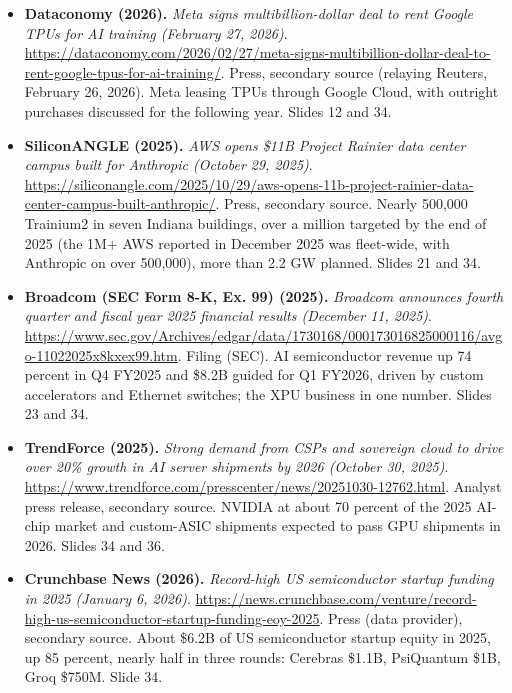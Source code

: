 \begin{itemize}[leftmargin=1.2em,itemsep=3pt]
\item \textbf{Dataconomy (2026).} \textit{Meta signs multibillion-dollar deal to rent Google TPUs for AI training (February 27, 2026)}. \url{https://dataconomy.com/2026/02/27/meta-signs-multibillion-dollar-deal-to-rent-google-tpus-for-ai-training/}. Press, secondary source (relaying Reuters, February 26, 2026). Meta leasing TPUs through Google Cloud, with outright purchases discussed for the following year. Slides 12 and 34.
\item \textbf{SiliconANGLE (2025).} \textit{AWS opens \$11B Project Rainier data center campus built for Anthropic (October 29, 2025)}. \url{https://siliconangle.com/2025/10/29/aws-opens-11b-project-rainier-data-center-campus-built-anthropic/}. Press, secondary source. Nearly 500,000 Trainium2 in seven Indiana buildings, over a million targeted by the end of 2025 (the 1M+ AWS reported in December 2025 was fleet-wide, with Anthropic on over 500,000), more than 2.2 GW planned. Slides 21 and 34.
\item \textbf{Broadcom (SEC Form 8-K, Ex. 99) (2025).} \textit{Broadcom announces fourth quarter and fiscal year 2025 financial results (December 11, 2025)}. \url{https://www.sec.gov/Archives/edgar/data/1730168/000173016825000116/avgo-11022025x8kxex99.htm}. Filing (SEC). AI semiconductor revenue up 74 percent in Q4 FY2025 and \$8.2B guided for Q1 FY2026, driven by custom accelerators and Ethernet switches; the XPU business in one number. Slides 23 and 34.
\item \textbf{TrendForce (2025).} \textit{Strong demand from CSPs and sovereign cloud to drive over 20\% growth in AI server shipments by 2026 (October 30, 2025)}. \url{https://www.trendforce.com/presscenter/news/20251030-12762.html}. Analyst press release, secondary source. NVIDIA at about 70 percent of the 2025 AI-chip market and custom-ASIC shipments expected to pass GPU shipments in 2026. Slides 34 and 36.
\item \textbf{Crunchbase News (2026).} \textit{Record-high US semiconductor startup funding in 2025 (January 6, 2026)}. \url{https://news.crunchbase.com/venture/record-high-us-semiconductor-startup-funding-eoy-2025}. Press (data provider), secondary source. About \$6.2B of US semiconductor startup equity in 2025, up 85 percent, nearly half in three rounds: Cerebras \$1.1B, PsiQuantum \$1B, Groq \$750M. Slide 34.
\end{itemize}
